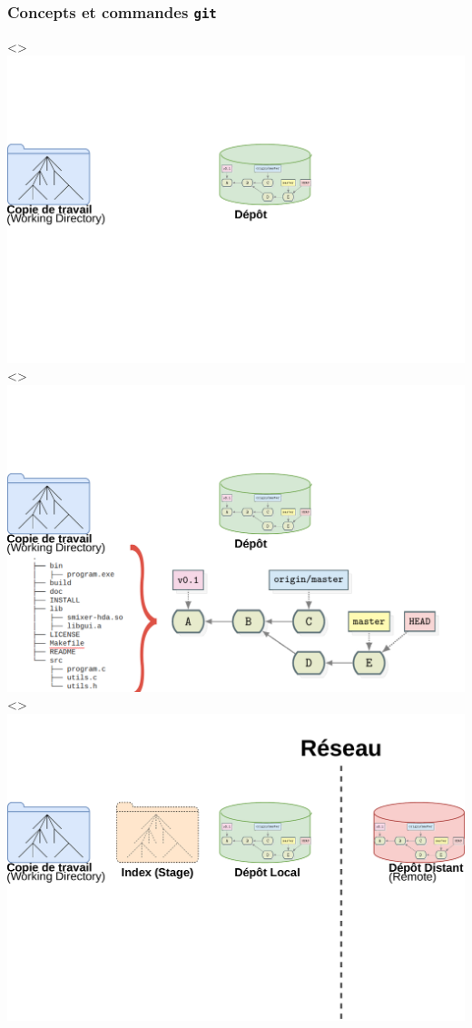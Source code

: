 \documentclass[table,tikz,12pt,svgnames]{beamer}
\begin{document}
\begin{frame}
\frametitle{Concepts et commandes \texttt{git}}
\begin{adjustwidth}{-0.75cm}{0cm}{}
\vspace{-1em}
	\begin{center}
		\setcounter{numSlide}{1}
		\ifANIMATE
			\only<\value{numSlide}>{{\includegraphics[scale=0.44]{images/workflow1.pdf}}}
			\only<\value{numSlide}>{{\includegraphics[scale=0.44]{images/workflow2.pdf}}}
			\only<\value{numSlide}>{{\includegraphics[scale=0.44]{images/workflow3.pdf}}}

\end{center}
\end{adjustwidth}
\end{frame}
\end{document}
